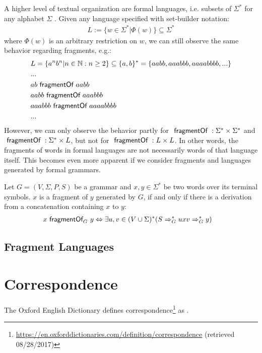 A higher level of textual organization are formal languages, i.e. subsets of $\Sigma^\ast$ for any alphabet $\Sigma$ \cite{DBLP:books/daglib/0090590}.
Given any language specified with set-builder notation:
\begin{align}
L := \{ w \in \Sigma^\ast | \Phi(w) \} \subseteq \Sigma^\ast 
\end{align}
where $\Phi(w)$ is an arbitrary restriction on $w$, we can still observe the same behavior regarding fragments, e.g.:
\begin{align*}
&L = \{ a^n b^n | n \in \mathbb{N} : n \geq 2 \} \subseteq \{a,b\}^\ast 
= \{ aabb, aaabbb, aaaabbbb, ... \}
\\&...
\\&ab ~\textsf{fragmentOf}~ aabb
\\&aabb ~\textsf{fragmentOf}~ aaabbb
\\&aaabbb ~\textsf{fragmentOf}~ aaaabbbb
\\&...
\end{align*}
However, we can only observe the behavior partly for $~\textsf{fragmentOf}~: \Sigma^\ast \times \Sigma^\ast$ and $~\textsf{fragmentOf}~: \Sigma^\ast \times L$, but not for $~\textsf{fragmentOf}~: L \times L$.
In other words, the fragments of words in formal languages are not necessarily words of that language itself.
This becomes even more apparent if we consider fragments and languages generated by formal grammars.

\begin{definition}
Let $G = (V,\Sigma,P,S)$ be a grammar and $x,y \in \Sigma^\ast$ be two words over its terminal symbols. $x$ is a fragment of $y$ generated by $G$, if and only if there is a derivation from a concatenation containing $x$ to $y$:
\begin{align}
&x ~\textsf{fragmentOf}_{G}~ y 
\Leftrightarrow
\exists u,v \in (V \cup \Sigma)^\ast 
(S \Rightarrow_G^\ast u x v \Rightarrow_G^\ast y)
\end{align}
\end{definition}



\subsection{Fragment Languages}

\section{Correspondence}
The Oxford English Dictionary defines correspondence\footnote{\url{https://en.oxforddictionaries.com/definition/correspondence} (retrieved 08/28/2017)} as .
\cite{DBLP:conf/sle/Lammel16}

